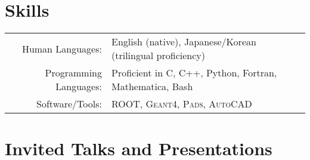 \documentclass[10pt]{article} %
\begin{document}

\section{Skills}

\noindent\begin{tabularx}{\linewidth}{@{}rl}
	Human Languages: & English (native), Japanese/Korean (trilingual proficiency)\\
	Programming Languages: & Proficient in C, C++, Python, Fortran, Mathematica, Bash\\
	Software/Tools: & \textsc{ROOT}, \textsc{Geant4}, \textsc{Pads}, \textsc{AutoCAD}
\end{tabularx}


%
%


\clearpage
\section{Invited Talks and Presentations}
\end{document}
